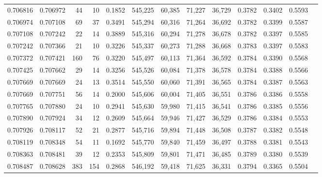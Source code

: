 \begin{tabular}{rrrrrrrrrrrrr}
0.706816 & 0.706972 &    44 &  10 &                                     0.1852 & 545,225 &  60,385 &  71,227 &  36,729 & 0.3782 & 0.3402 & 0.5593 \\
0.706974 & 0.707108 &    69 &  37 &                                     0.3491 & 545,294 &  60,316 &  71,264 &  36,692 & 0.3782 & 0.3399 & 0.5587 \\
0.707108 & 0.707242 &    22 &  14 &                                     0.3889 & 545,316 &  60,294 &  71,278 &  36,678 & 0.3782 & 0.3397 & 0.5585 \\
0.707242 & 0.707366 &    21 &  10 &                                     0.3226 & 545,337 &  60,273 &  71,288 &  36,668 & 0.3783 & 0.3397 & 0.5583 \\
0.707372 & 0.707421 &   160 &  76 &                                     0.3220 & 545,497 &  60,113 &  71,364 &  36,592 & 0.3784 & 0.3390 & 0.5568 \\
0.707425 & 0.707662 &    29 &  14 &                                     0.3256 & 545,526 &  60,084 &  71,378 &  36,578 & 0.3784 & 0.3388 & 0.5566 \\
0.707669 & 0.707669 &    24 &  13 &                                     0.3514 & 545,550 &  60,060 &  71,391 &  36,565 & 0.3784 & 0.3387 & 0.5563 \\
0.707669 & 0.707751 &    56 &  14 &                                     0.2000 & 545,606 &  60,004 &  71,405 &  36,551 & 0.3786 & 0.3386 & 0.5558 \\
0.707765 & 0.707880 &    24 &  10 &                                     0.2941 & 545,630 &  59,980 &  71,415 &  36,541 & 0.3786 & 0.3385 & 0.5556 \\
0.707890 & 0.707924 &    34 &  12 &                                     0.2609 & 545,664 &  59,946 &  71,427 &  36,529 & 0.3786 & 0.3384 & 0.5553 \\
0.707926 & 0.708117 &    52 &  21 &                                     0.2877 & 545,716 &  59,894 &  71,448 &  36,508 & 0.3787 & 0.3382 & 0.5548 \\
0.708119 & 0.708348 &    54 &  11 &                                     0.1692 & 545,770 &  59,840 &  71,459 &  36,497 & 0.3788 & 0.3381 & 0.5543 \\
0.708363 & 0.708481 &    39 &  12 &                                     0.2353 & 545,809 &  59,801 &  71,471 &  36,485 & 0.3789 & 0.3380 & 0.5539 \\
0.708487 & 0.708628 &   383 & 154 &                                     0.2868 & 546,192 &  59,418 &  71,625 &  36,331 & 0.3794 & 0.3365 & 0.5504 \\

\end{tabular}
